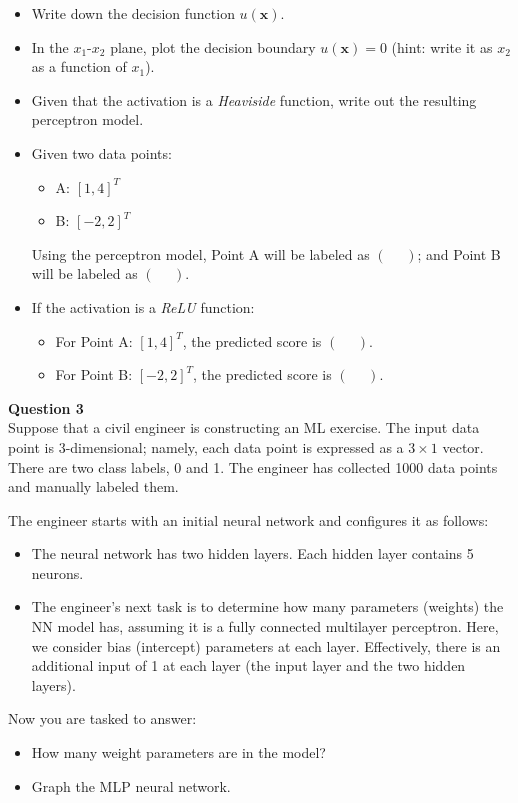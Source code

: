 \documentclass[12pt]{article}
\begin{document}
\begin{itemize}
    \item Write down the decision function \( u(\bm{x}) \).
    \item In the \(x_1\text{-}x_2\) plane, plot the decision boundary \( u(\bm{x}) = 0 \) (hint: write it as \(x_2\) as a function of \(x_1\)).
    \item Given that the activation is a \textit{Heaviside} function, write out the resulting perceptron model.
    \item Given two data points:
    \begin{itemize}
        \item A: \([1, 4]^T\)
        \item B: \([-2, 2]^T\)
    \end{itemize}
    Using the perceptron model, Point A will be labeled as \((\ \ \ \ \ \ )\); and Point B will be labeled as \((\ \ \ \ \ \ )\).
    \item If the activation is a \textit{ReLU} function:
    \begin{itemize}
        \item For Point A: \([1, 4]^T\), the predicted score is \((\ \ \ \ \ \ )\).
        \item For Point B: \([-2, 2]^T\), the predicted score is \((\ \ \ \ \ \ )\).
    \end{itemize}
\end{itemize}

\bigskip

\newpage

\textbf{Question 3} \\

Suppose that a civil engineer is constructing an ML exercise. The input data point is 3-dimensional; namely, each data point is expressed as a \(3\times 1\) vector. There are two class labels, 0 and 1. The engineer has collected 1000 data points and manually labeled them.

The engineer starts with an initial neural network and configures it as follows:
\begin{itemize}
    \item The neural network has two hidden layers. Each hidden layer contains 5 neurons.
    \item The engineer's next task is to determine how many parameters (weights) the NN model has, assuming it is a fully connected multilayer perceptron. Here, we consider bias (intercept) parameters at each layer. Effectively, there is an additional input of 1 at each layer (the input layer and the two hidden layers).
\end{itemize}
Now you are tasked to answer:
\begin{itemize}
    \item How many weight parameters are in the model?
    \item Graph the MLP neural network.
\end{itemize}

\newpage

\end{document}
